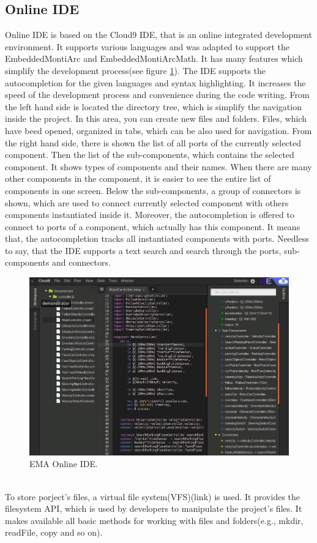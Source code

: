 \subsection{Online IDE} \label{sec:onlineide}
Online IDE is based on the Cloud9 IDE, that is an online integrated development environment. It supports various languages and was adapted to support the EmbeddedMontiArc and EmbeddedMontiArcMath. It has many features which simplify the development process(see figure \ref{fig:onlineIDE}). The IDE supports the autocompletion for the given languages and syntax highlighting. It increases the speed of the development process and convenience during the code writing. From the left hand side is located the directory tree, which is simplify the navigation inside the project. In this area, you can create new files and folders. Files, which have beed opened, organized in tabs, which can be also used for navigation. From the right hand side, there is shown the list of all ports of the currently selected component. Then the list of the sub-components, which contains the selected component. It shows types of components and their names. When there are many other components in the component, it is easier to see the entire list of components in one screen. Below the sub-components, a group of connectors is shown, which are used to connect currently selected component with others components instantiated inside it. Moreover, the autocompletion is offered to connect to ports of a component, which actually has this component. It means that, the autocompletion tracks all instantiated components with ports. Needless to say, that the IDE supports a text search and search through the ports, sub-components and connectors.
\begin{figure}[h!]
    \centering
    \includegraphics[width=0.8\linewidth]{src/pic/onlineIDE}
    \caption{EMA Online IDE.}
    \label{fig:onlineIDE}
\end{figure} \\
To store porject's files, a virtual file system(VFS)(link) is used. It provides the filesystem API, which is used by developers to manipulate the project's files. It makes available all basic methods for working with files and folders(e.g., mkdir, readFile, copy and so on).
